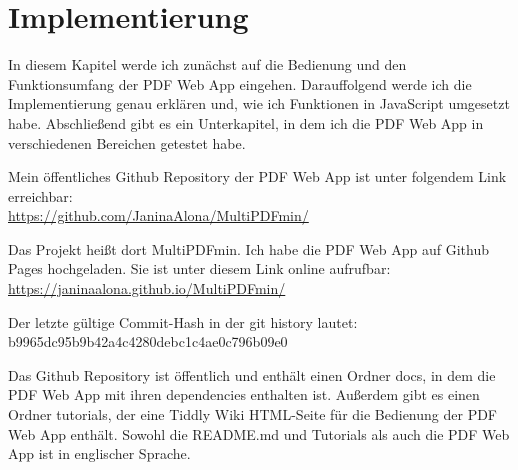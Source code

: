 \chapter{Implementierung}
In diesem Kapitel werde ich zunächst auf die Bedienung und den Funktionsumfang der PDF Web App eingehen. Darauffolgend werde ich die Implementierung genau erklären und, wie ich Funktionen in JavaScript umgesetzt habe. Abschließend gibt es ein Unterkapitel, in dem ich die PDF Web App in verschiedenen Bereichen getestet habe.

Mein öffentliches Github Repository der PDF Web App ist unter folgendem Link erreichbar: \\
\url{https://github.com/JaninaAlona/MultiPDFmin/}

Das Projekt heißt dort MultiPDFmin. Ich habe die PDF Web App auf Github Pages hochgeladen. Sie ist unter diesem Link online aufrufbar: \\
\url{https://janinaalona.github.io/MultiPDFmin/}

Der letzte gültige Commit-Hash in der git history lautet: \\
b9965dc95b9b42a4c4280debc1c4ae0c796b09e0

Das Github Repository ist öffentlich und enthält einen Ordner docs, in dem die PDF Web App mit ihren dependencies enthalten ist. Außerdem gibt es einen Ordner tutorials, der eine Tiddly Wiki HTML-Seite für die Bedienung der PDF Web App enthält. Sowohl die README.md und Tutorials als auch die PDF Web App ist in englischer Sprache.



